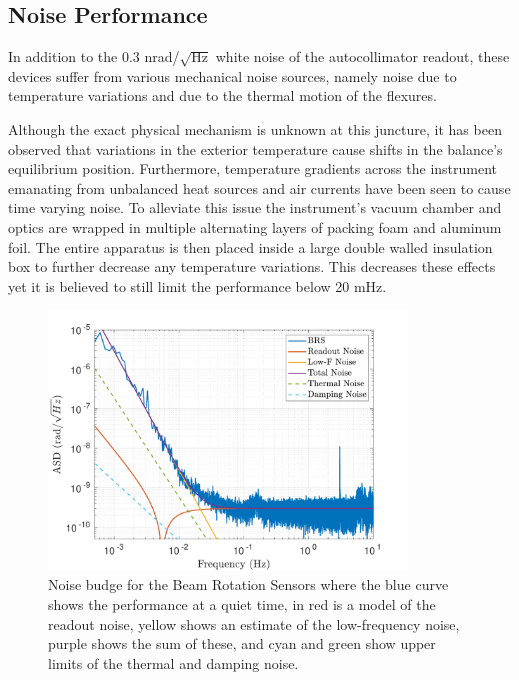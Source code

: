\documentclass [12pt, proquest]{uwthesis}[2019]
\begin{document}
\subsection{Noise Performance}

In addition to the 0.3 nrad/$\sqrt{\text{Hz}}$ white noise of the autocollimator readout, these devices suffer from various mechanical noise sources, namely noise due to temperature variations and due to the thermal motion of the flexures.

Although the exact physical mechanism is unknown at this juncture, it has been observed that variations in the exterior temperature cause shifts in the balance's equilibrium position. Furthermore, temperature gradients across the instrument emanating from unbalanced heat sources and air currents have been seen to cause time varying noise. To alleviate this issue the instrument's vacuum chamber and optics are wrapped in multiple alternating layers of packing foam and aluminum foil. The entire apparatus is then placed inside a large double walled insulation box to further decrease any temperature variations. This decreases these effects yet it is believed to still limit the performance below 20 mHz.

\begin{figure}
\begin{center}
\includegraphics[width=0.85\textwidth]{BRSNoiseModel.pdf}
\caption[Noise budge for the Beam Rotation Sensors]{Noise budge for the Beam Rotation Sensors where the blue curve shows the performance at a quiet time, in red is a model of the readout noise, yellow shows an estimate of the low-frequency noise, purple shows the sum of these, and cyan and green show upper limits of the thermal and damping noise.}
\label{noise}
\end{center}
\end{figure}
\end{document}
